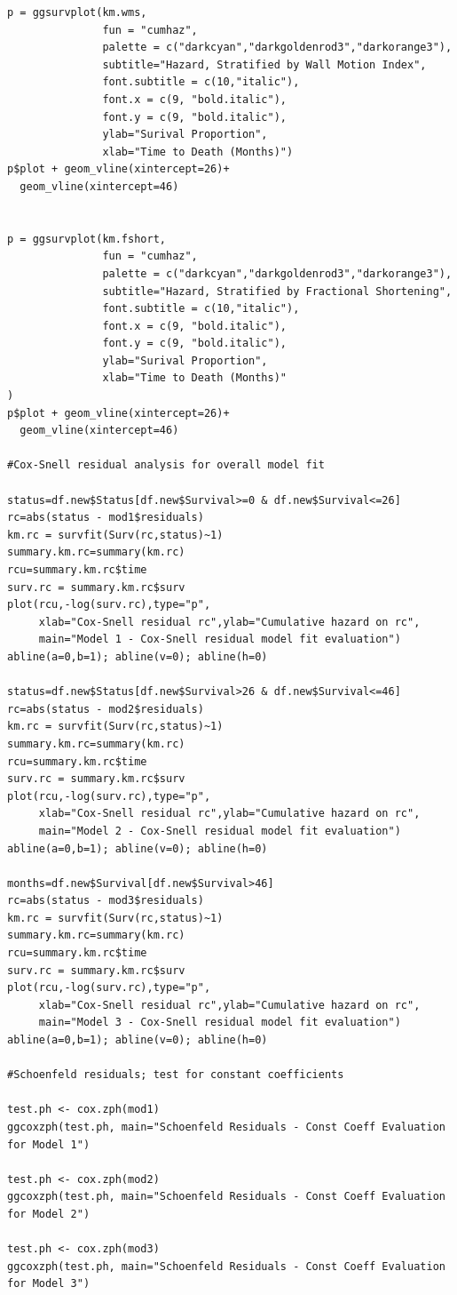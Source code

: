 \documentclass[
]{article}
\begin{document}
\begin{verbatim}
p = ggsurvplot(km.wms, 
               fun = "cumhaz",
               palette = c("darkcyan","darkgoldenrod3","darkorange3"), 
               subtitle="Hazard, Stratified by Wall Motion Index",
               font.subtitle = c(10,"italic"),
               font.x = c(9, "bold.italic"),
               font.y = c(9, "bold.italic"),
               ylab="Surival Proportion", 
               xlab="Time to Death (Months)")
p$plot + geom_vline(xintercept=26)+
  geom_vline(xintercept=46)


p = ggsurvplot(km.fshort, 
               fun = "cumhaz",
               palette = c("darkcyan","darkgoldenrod3","darkorange3"), 
               subtitle="Hazard, Stratified by Fractional Shortening",
               font.subtitle = c(10,"italic"),
               font.x = c(9, "bold.italic"),
               font.y = c(9, "bold.italic"),
               ylab="Surival Proportion", 
               xlab="Time to Death (Months)"
)
p$plot + geom_vline(xintercept=26)+
  geom_vline(xintercept=46)

#Cox-Snell residual analysis for overall model fit

status=df.new$Status[df.new$Survival>=0 & df.new$Survival<=26]
rc=abs(status - mod1$residuals)
km.rc = survfit(Surv(rc,status)~1)
summary.km.rc=summary(km.rc)
rcu=summary.km.rc$time
surv.rc = summary.km.rc$surv
plot(rcu,-log(surv.rc),type="p",
     xlab="Cox-Snell residual rc",ylab="Cumulative hazard on rc",
     main="Model 1 - Cox-Snell residual model fit evaluation")
abline(a=0,b=1); abline(v=0); abline(h=0)

status=df.new$Status[df.new$Survival>26 & df.new$Survival<=46]
rc=abs(status - mod2$residuals)
km.rc = survfit(Surv(rc,status)~1)
summary.km.rc=summary(km.rc)
rcu=summary.km.rc$time
surv.rc = summary.km.rc$surv
plot(rcu,-log(surv.rc),type="p",
     xlab="Cox-Snell residual rc",ylab="Cumulative hazard on rc",
     main="Model 2 - Cox-Snell residual model fit evaluation")
abline(a=0,b=1); abline(v=0); abline(h=0)

months=df.new$Survival[df.new$Survival>46]
rc=abs(status - mod3$residuals)
km.rc = survfit(Surv(rc,status)~1)
summary.km.rc=summary(km.rc)
rcu=summary.km.rc$time
surv.rc = summary.km.rc$surv
plot(rcu,-log(surv.rc),type="p",
     xlab="Cox-Snell residual rc",ylab="Cumulative hazard on rc",
     main="Model 3 - Cox-Snell residual model fit evaluation")
abline(a=0,b=1); abline(v=0); abline(h=0)

#Schoenfeld residuals; test for constant coefficients 

test.ph <- cox.zph(mod1)
ggcoxzph(test.ph, main="Schoenfeld Residuals - Const Coeff Evaluation for Model 1")

test.ph <- cox.zph(mod2)
ggcoxzph(test.ph, main="Schoenfeld Residuals - Const Coeff Evaluation for Model 2")

test.ph <- cox.zph(mod3)
ggcoxzph(test.ph, main="Schoenfeld Residuals - Const Coeff Evaluation for Model 3")
\end{verbatim}
\end{document}
